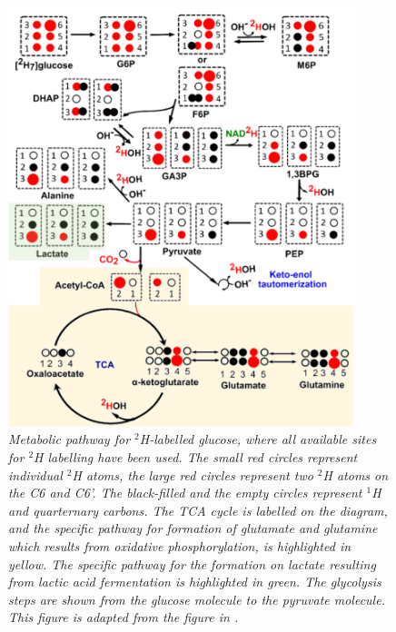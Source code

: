 \begin{figure}
    \centering
    \includegraphics[width=0.9\textwidth]{Figures/Intro/D7_Metabolism.png}
    \caption{\textit{Metabolic pathway for $^2$H-labelled glucose, where all available sites for $^2$H labelling have been used. The small red circles represent individual $^2$H atoms, the large red circles represent two $^2$H atoms on the C6 and C6'. The black-filled and the empty circles represent $^1$H and quarternary carbons. The \ac{TCA} cycle is labelled on the diagram, and the specific pathway for formation of glutamate and glutamine which results from oxidative phosphorylation, is highlighted in yellow. The specific pathway for the formation on lactate resulting from lactic acid fermentation is highlighted in green. The glycolysis steps are shown from the glucose molecule to the pyruvate molecule. This figure is adapted from the figure in \cite{Mahar2021DeuteratedGlucose}.}}
    \label{fig:intro:D7Metabolism}
\end{figure}

